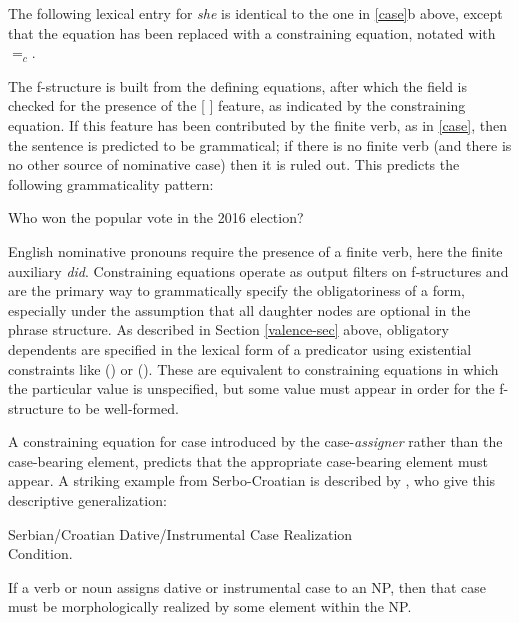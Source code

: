 The following lexical entry for \textit{she} is identical to the one in \ref{case}b above, except that the  equation has been replaced with a constraining equation, notated with $=_c$.  

\ea
\label{constrain}
{\qquad{} }
\z
The f-structure is built from the defining equations, after which the \subj{} field is checked for the presence of the [ ] feature, as indicated by the constraining equation.  If this feature has been contributed by the finite verb, as in \ref{case}, then the sentence is predicted to be grammatical; if there is no finite verb (and there is no other source of nominative case) then it is ruled out.  This predicts the following grammaticality pattern:

\begin{exe}
\ex  Who won the popular vote in the 2016 election? 
\label{she}
\begin{xlist}
\end{xlist}
\end{exe}
English nominative pronouns require the presence of a finite verb, here the finite auxiliary \textit{did}.  Constraining equations operate as output filters on f-structures and are the primary way to grammatically specify the obligatoriness of a form, especially under the assumption that all daughter nodes are optional in the phrase structure.  As described in Section \ref{valence-sec} above, obligatory dependents are specified in the lexical form of a predicator using existential constraints like (\up \subj) or (\up \obj).  These are equivalent to constraining equations in which the particular value is unspecified, but some value must appear in order for the f-structure to be well-formed.  

A constraining equation for case  introduced by the case-\textit{assigner} rather than the case-bearing element, predicts that the appropriate case-bearing element must appear.  A striking example from Serbo-Croatian is described by \citet[p. 134]{WZ2003a}, who give this descriptive generalization:

\ea
{\label{dat-inst}
Serbian/Croatian Dative/Instrumental Case 
Realization\\ Condition.\medskip

If a verb or noun assigns dative or instrumental case to an NP, then that case must be morphologically realized by some element within the NP.}
\z

